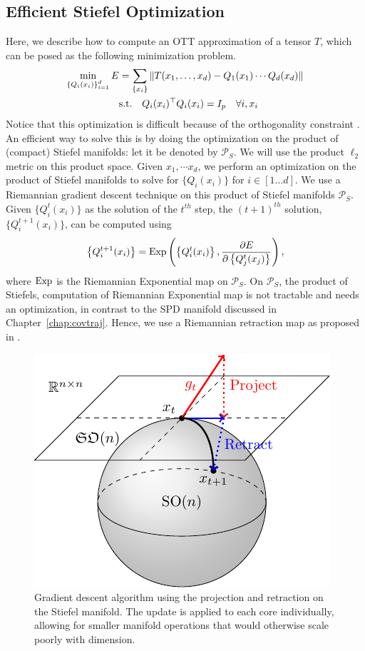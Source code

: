 \subsection{Efficient Stiefel Optimization}\label{sec:opt}
Here, we describe how to compute an OTT approximation of a tensor $T$, which can be posed as the following minimization problem.
\begin{align}
\min_{\left\{Q_i(x_i)\right\}_{i=1}^d} E &= \sum_{\left\{x_i\right\}} \|T(x_1,\ldots,x_d) - Q_1(x_1)\cdots Q_d(x_d)\| \notag \\ \quad & \mbox{s.t.} \quad Q_i(x_i)^\top Q_i(x_i) = I_p \quad \forall i, x_i
\end{align}
Notice that this optimization is difficult because of the orthogonality constraint \citep{edelman1998geometry,collins2014spectral}. An efficient way to solve this is by doing the optimization on the product of (compact) Stiefel manifolds: let it be denoted by $\mathcal{P}_S$. We will use the product $\ell_2$ metric on this product space. Given $x_1, \cdots x_d$, we perform
an optimization on the product of Stiefel manifolds to solve for $\{Q_i(x_i)\}$ for $i\in[1\ldots d]$. We use a Riemannian gradient descent technique on this product of Stiefel manifolds $\mathcal{P}_S$. Given $\{Q^t_i(x_i)\}$ as the solution of the $t^{th}$ step, the $(t+1)^{th}$ solution, $\{Q^{t+1}_i(x_i)\}$, can be computed using 
\begin{equation}
\left\{Q^{t+1}_i(x_i)\right\} = \operatorname*{Exp}\left(\left\{Q^{t}_i(x_i)\right\}, \frac{\partial E}{\partial \left\{Q^{t}_j(x_j)\right\}}\right),
\end{equation}
where $\operatorname*{Exp}$ is the Riemannian Exponential map on $\mathcal{P}_S$. On $\mathcal{P}_S$, the product of Stiefels, computation of Riemannian Exponential map is not tractable and needs an optimization,
in contrast to the SPD manifold discussed in Chapter~\ref{chap:covtraj}.
Hence, we
use a Riemannian retraction map as proposed in \cite{6340355}.
\begin{figure}
	\centering
	\includegraphics[width=0.75\columnwidth,trim={0 1.5cm 0 0},clip]{4_ott/figs/stiefel/stiefel_update.pdf}
	\caption[Gradient descent on Stiefels]{\label{fig:ott_opt} Gradient descent algorithm using the projection and retraction on the Stiefel manifold. The update is applied to each core individually, allowing for smaller manifold operations that would otherwise scale poorly with dimension.}
\end{figure}

